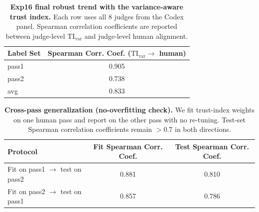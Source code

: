 \documentclass[numbers]{article}
\begin{document}
\begin{table}[t]
  \centering
  \small
  \begin{tabular}{lc}
    \toprule
    \textbf{Label Set} & \textbf{Spearman Corr. Coef. (\(\mathrm{TI}_{\mathrm{var}}\rightarrow\) human)} \\
    \midrule
    pass1              & 0.905                                                                           \\
    pass2              & 0.738                                                                           \\
    avg                & 0.833                                                                           \\
    \bottomrule
  \end{tabular}
  \caption{\textbf{Exp16 final robust trend with the variance-aware trust index.}
  Each row uses all \(8\) judges from the Codex panel.
  Spearman correlation coefficients are reported between judge-level \(\mathrm{TI}_{\mathrm{var}}\) and judge-level human alignment.}
  \label{tab:exp16_final_trend}
\end{table}

\begin{table}[t]
  \centering
  \small
  \begin{tabular}{lcc}
    \toprule
    \textbf{Protocol}                          & \textbf{Fit Spearman Corr. Coef.} & \textbf{Test Spearman Corr. Coef.} \\
    \midrule
    Fit on pass1 \(\rightarrow\) test on pass2 & 0.881                             & 0.810                              \\
    Fit on pass2 \(\rightarrow\) test on pass1 & 0.857                             & 0.786                              \\
    \bottomrule
  \end{tabular}
  \caption{\textbf{Cross-pass generalization (no-overfitting check).}
    We fit trust-index weights on one human pass and report on the other pass with no re-tuning.
    Test-set Spearman correlation coefficients remain \(>0.7\) in both directions.}
  \label{tab:cross_pass_generalization}
\end{table}
\end{document}
